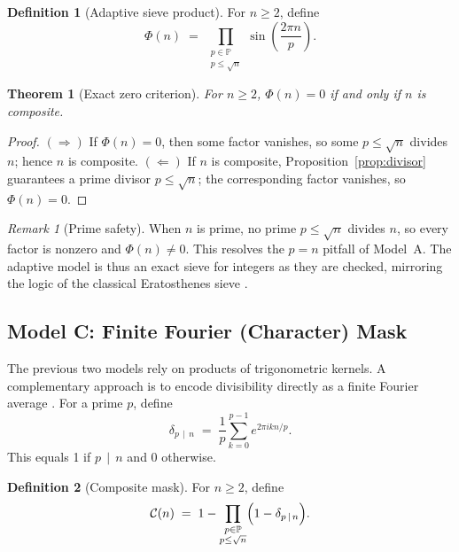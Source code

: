 \documentclass[12pt]{article}
\newtheorem{theorem}{Theorem}
\theoremstyle{definition}
\newtheorem{definition}{Definition}
\theoremstyle{remark}
\newtheorem{remark}{Remark}
\newcommand{\Primes}{\mathbb{P}}
\newcommand{\divides}{\,\mid\,}
\begin{document}
\begin{definition}[Adaptive sieve product]
For \(n\ge 2\), define
\[
  \Phi(n)\;=\; \prod_{\substack{p\in\Primes\\ p\le \sqrt{n}}} \sin\!\left(\frac{2\pi n}{p}\right).
\]
\end{definition}

\begin{theorem}[Exact zero criterion]\label{thm:adaptive-exact}
For \(n\ge 2\), \(\Phi(n)=0\) if and only if \(n\) is composite.
\end{theorem}
\begin{proof}
\((\Rightarrow)\) If \(\Phi(n)=0\), then some factor vanishes, so some \(p\le\sqrt{n}\) divides \(n\); hence \(n\) is composite.  
\((\Leftarrow)\) If \(n\) is composite, Proposition~\ref{prop:divisor} guarantees a prime divisor \(p\le\sqrt{n}\); 
the corresponding factor vanishes, so \(\Phi(n)=0\).
\end{proof}

\begin{remark}[Prime safety]
When \(n\) is prime, no prime \(p\le \sqrt{n}\) divides \(n\), so every factor is nonzero and \(\Phi(n)\neq 0\). 
This resolves the \(p=n\) pitfall of Model~A. 
The adaptive model is thus an exact sieve for integers as they are checked, mirroring the logic of the classical 
Eratosthenes sieve \citep{rosser1962approximate,apostol1976introduction}.
\end{remark}

\subsection{Model C: Finite Fourier (Character) Mask}\label{subsec:fourier}

The previous two models rely on products of trigonometric kernels. 
A complementary approach is to encode divisibility directly as a finite Fourier average 
\citep{montgomery2006multiplicative,iwakura1982ramanujan}. 
For a prime \(p\), define
\[
\delta_{p\divides n}
\;=\;
\frac{1}{p}\sum_{k=0}^{p-1} e^{2\pi i k n/p}.
\]
This equals 1 if \(p \divides n\) and 0 otherwise.

\begin{definition}[Composite mask]
For \(n \ge 2\), define
\[
\mathcal{C}(n)
\;=\;
1 - \prod_{\substack{p\in\Primes\\ p\le \sqrt{n}}}
\Bigl(1 - \delta_{p\divides n}\Bigr).
\]
\end{definition}
\end{document}
